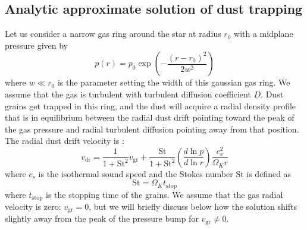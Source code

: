 \documentclass{aa}
\begin{document}
\subsection{Analytic approximate solution of dust trapping}
\label{sec-analytic-model-of-trapping}
%
Let us consider a narrow gas ring around the star at radius $r_0$ with a
midplane pressure given by
\begin{equation}\label{eq-gaussian-pressure-bump-repeat}
p(r) = p_0 \exp\left(-\frac{(r-r_0)^2}{2w^2}\right)
\end{equation}
where $w\ll r_0$ is the parameter setting the width of this gaussian gas ring.
We assume that the gas is turbulent with turbulent diffusion coefficient
$D$. Dust grains get trapped in this ring, and the dust will acquire a
radial density profile that is in equilibrium between the radial dust drift
pointing toward the peak of the gas pressure and radial turbulent diffusion
pointing away from that position. The radial dust drift velocity is
\citep[see e.g.][]{2010A&A...513A..79B}:
\begin{equation}\label{eq-v-radial-drift}
  v_{\mathrm{dr}} = \frac{\mathrm{1}}{1+\mathrm{St}^{2}}v_{\mathrm{gr}} +
  \frac{\mathrm{St}}{1+\mathrm{St}^{2}}
  \left(\frac{d\ln p}{d\ln r}\right)\frac{c_s^2}{\Omega_Kr}
\end{equation}
where $c_s$ is the isothermal sound speed and the Stokes number $\mathrm{St}$ is
defined as
\begin{equation}\label{eq-definition-stokes-number}
\mathrm{St} = \Omega_Kt_{\mathrm{stop}}
\end{equation}
where $t_{\mathrm{stop}}$ is the stopping time of the grains. We assume that the
gas radial velocity is zero: $v_{\mathrm{gr}}=0$, but we will briefly discuss
below how the solution shifts slightly away from the peak of the pressure bump
for $v_{\mathrm{gr}}\neq 0$.
\end{document}
